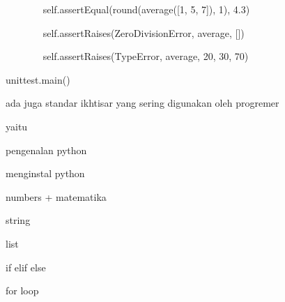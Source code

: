 \documentclass[a4paper,12pt]{report}
\begin{document}
\noindent 
{\fontsize{14pt}{14pt}\selectfont ~~~~~~~ self.assertEqual(round(average([1, 5, 7]), 1), 4.3) \\} \par
\vspace{14pt}
\noindent 
{\fontsize{14pt}{14pt}\selectfont ~~~~~~~ self.assertRaises(ZeroDivisionError, average, []) \\} \par
\vspace{14pt}
\noindent 
{\fontsize{14pt}{14pt}\selectfont ~~~~~~~ self.assertRaises(TypeError, average, 20, 30, 70) \\} \par
\vspace{14pt}
\noindent 
{\fontsize{14pt}{14pt}\selectfont unittest.main()  \\} \par
\vspace{14pt}
\noindent 
{\fontsize{14pt}{14pt}\selectfont ada juga standar ikhtisar yang sering digunakan oleh progremer  \\} \par
\noindent 
{\fontsize{14pt}{14pt}\selectfont yaitu \\} \par
\vspace{14pt}
\noindent 
{\fontsize{14pt}{14pt}\selectfont pengenalan python \\} \par
\vspace{14pt}
\noindent 
{\fontsize{14pt}{14pt}\selectfont menginstal python \\} \par
\vspace{14pt}
\noindent 
{\fontsize{14pt}{14pt}\selectfont numbers + matematika \\} \par
\vspace{14pt}
\noindent 
{\fontsize{14pt}{14pt}\selectfont string \\} \par
\vspace{14pt}
\noindent 
{\fontsize{14pt}{14pt}\selectfont list  \\} \par
\vspace{14pt}
\noindent 
{\fontsize{14pt}{14pt}\selectfont if elif else \\} \par
\vspace{14pt}
\noindent 
{\fontsize{14pt}{14pt}\selectfont for loop \\} \par
\end{document}
